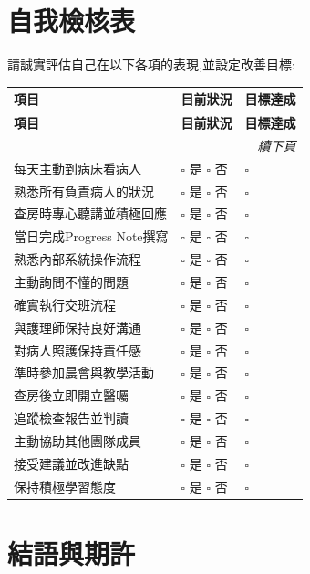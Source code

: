 \documentclass[12pt,a4paper]{article}
\begin{document}
\newpage

\section{自我檢核表}

請誠實評估自己在以下各項的表現,並設定改善目標:

\begin{longtable}{p{}p{}p{}}
\toprule
\textbf{項目} & \textbf{目前狀況} & \textbf{目標達成} \\
\midrule
\endfirsthead
\toprule
\textbf{項目} & \textbf{目前狀況} & \textbf{目標達成} \\
\midrule
\endhead
\midrule
\multicolumn{3}{r}{\textit{續下頁}} \\
\endfoot
\bottomrule
\endlastfoot

每天主動到病床看病人 & $\square$ 是 $\square$ 否 & $\square$ \\
熟悉所有負責病人的狀況 & $\square$ 是 $\square$ 否 & $\square$ \\
查房時專心聽講並積極回應 & $\square$ 是 $\square$ 否 & $\square$ \\
當日完成Progress Note撰寫 & $\square$ 是 $\square$ 否 & $\square$ \\
熟悉內部系統操作流程 & $\square$ 是 $\square$ 否 & $\square$ \\
主動詢問不懂的問題 & $\square$ 是 $\square$ 否 & $\square$ \\
確實執行交班流程 & $\square$ 是 $\square$ 否 & $\square$ \\
與護理師保持良好溝通 & $\square$ 是 $\square$ 否 & $\square$ \\
對病人照護保持責任感 & $\square$ 是 $\square$ 否 & $\square$ \\
準時參加晨會與教學活動 & $\square$ 是 $\square$ 否 & $\square$ \\
查房後立即開立醫囑 & $\square$ 是 $\square$ 否 & $\square$ \\
追蹤檢查報告並判讀 & $\square$ 是 $\square$ 否 & $\square$ \\
主動協助其他團隊成員 & $\square$ 是 $\square$ 否 & $\square$ \\
接受建議並改進缺點 & $\square$ 是 $\square$ 否 & $\square$ \\
保持積極學習態度 & $\square$ 是 $\square$ 否 & $\square$ \\
\end{longtable}

\section{結語與期許}
\end{document}
